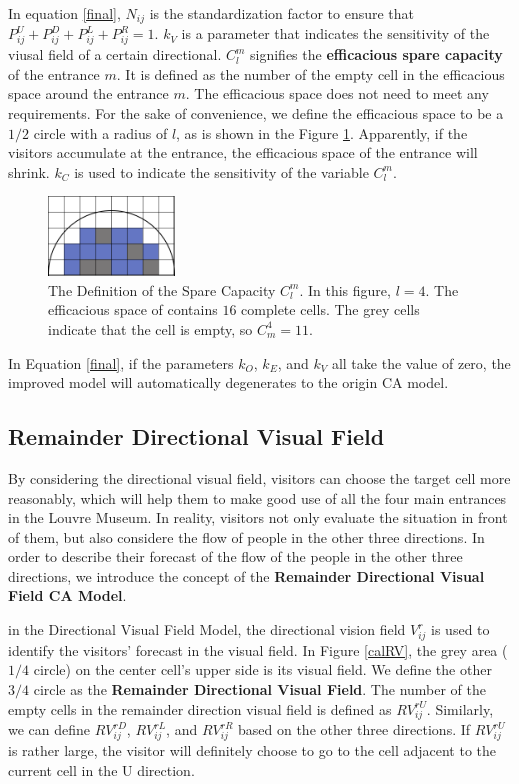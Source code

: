 \documentclass{mcmthesis}
\begin{document}
In equation \eqref{final}, $N_{ij}$ is the standardization factor to ensure that $P^U_{ij}+P^D_{ij}+P^L_{ij}+P^R_{ij}=1$. $k_V$ is a parameter that indicates the sensitivity of the viusal field of a certain directional. $C^m_l$ signifies the \textbf{efficacious spare capacity} of the entrance $m$. It is defined as the number of the empty cell in the efficacious space around the entrance $m$. The efficacious space does not need to meet any requirements. For the sake of convenience, we define the efficacious space to be a $1/2$ circle with a radius of $l$, as is shown in the Figure \ref{calV}. Apparently, if the visitors accumulate at the entrance, the efficacious space of the entrance will shrink. $k_C$ is used to indicate the sensitivity of the variable $C^m_l$. 
\begin{figure}[H]
	\centering
	\includegraphics[width=0.3\textwidth]{example-half.png}
\captionsetup{font=small, labelfont=bf}
	\caption{The Definition of the Spare Capacity $C^m_l$. In this figure, $l=4$. The efficacious space of contains $16$ complete cells. The grey cells indicate that the cell is empty, so $C^4_m=11$. }
	\label{calV}
\end{figure}

In Equation \eqref{final}, if the parameters $k_O$, $k_E$, and $k_V$ all take the value of zero, the improved model will automatically degenerates to the origin CA model.

\subsection{Remainder Directional Visual Field}
By considering the directional visual field, visitors can choose the target cell more reasonably, which will help them to make good use of all the four main entrances in the Louvre Museum. In reality, visitors not only evaluate the situation in front of them, but also considere the flow of people in the other three directions. In order to describe their forecast of the flow of the people in the other three directions, we introduce the concept of the \textbf{Remainder Directional Visual Field CA Model}.

in the Directional Visual Field Model, the directional vision field $V^r_{ij}$ is used to identify the visitors' forecast in the visual field. In Figure \ref{calRV}, the grey area ($1/4$ circle) on the center cell's upper side is its visual field. We define the other $3/4$ circle as the \textbf{Remainder Directional Visual Field}. The number of the empty cells in the remainder direction visual field is defined as $RV^{rU}_{ij}$. Similarly, we can define $RV^{rD}_{ij}$, $RV^{rL}_{ij}$, and $RV^{rR}_{ij}$ based on the other three directions. If $RV^{rU}_{ij}$ is rather large, the visitor will definitely choose to go to the cell adjacent to the current cell in the U direction. 
\end{document}
